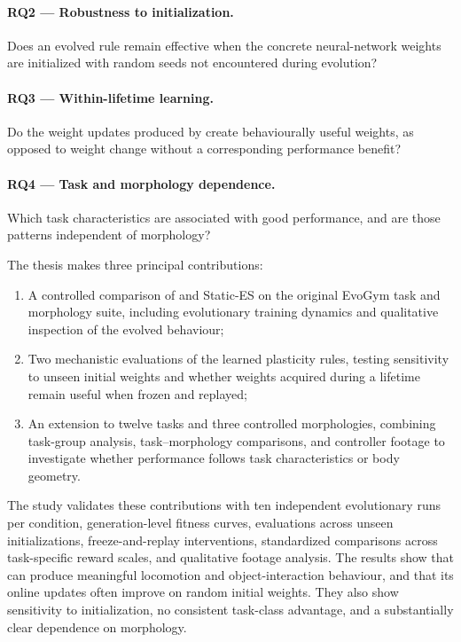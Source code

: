 \paragraph{RQ2 --- Robustness to initialization.}
Does an evolved \nchl{} rule remain effective when the concrete neural-network weights are initialized with random seeds not encountered during evolution?

\paragraph{RQ3 --- Within-lifetime learning.}
Do the weight updates produced by \nchl{} create behaviourally useful weights, as opposed to weight change without a corresponding performance benefit?

\paragraph{RQ4 --- Task and morphology dependence.}
Which task characteristics are associated with good \nchl{} performance, and are those patterns independent of morphology?


The thesis makes three principal contributions:
\begin{enumerate}
  \item A controlled comparison of \nchlcontroller{} and Static-ES on the original EvoGym task and morphology suite, including evolutionary training dynamics and qualitative inspection of the evolved behaviour;
  \item Two mechanistic evaluations of the learned plasticity rules, testing sensitivity to unseen initial weights and whether weights acquired during a lifetime remain useful when frozen and replayed;
  \item An extension to twelve tasks and three controlled morphologies, combining task-group analysis, task--morphology comparisons, and controller footage to investigate whether \nchl{} performance follows task characteristics or body geometry.
\end{enumerate}

The study validates these contributions with ten independent evolutionary runs per condition, generation-level fitness curves, evaluations across unseen initializations, freeze-and-replay interventions, standardized comparisons across task-specific reward scales, and qualitative footage analysis. The results show that \nchl{} can produce meaningful locomotion and object-interaction behaviour, and that its online updates often improve on random initial weights. They also show sensitivity to initialization, no consistent task-class advantage, and a substantially clear dependence on morphology.

